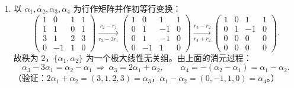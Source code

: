 \documentclass[12pt]{ctexart}
\begin{document}
\begin{enumerate}[label=\textbf{\arabic*.},itemsep=13pt]
\item 以 $\alpha_1,\alpha_2,\alpha_3,\alpha_4$ 为行作矩阵并作初等行变换：
  \[
  \begin{pmatrix}1&0&1&1\\1&1&0&1\\3&1&2&3\\0&-1&1&0\end{pmatrix}
  \xrightarrow[r_3-3r_1]{r_2-r_1}
  \begin{pmatrix}1&0&1&1\\0&1&-1&0\\0&1&-1&0\\0&-1&1&0\end{pmatrix}
  \xrightarrow[r_4+r_2]{r_3-r_2}
  \begin{pmatrix}1&0&1&1\\0&1&-1&0\\0&0&0&0\\0&0&0&0\end{pmatrix}.
  \]
  故秩为 $2$，$\{\alpha_1,\alpha_2\}$ 为一个极大线性无关组。由上面的消元过程：
  \[
  \alpha_3-3\alpha_1=\alpha_2-\alpha_1\ \Rightarrow\ \alpha_3=2\alpha_1+\alpha_2,\qquad
  \alpha_4=-(\alpha_2-\alpha_1)=\alpha_1-\alpha_2.
  \]
  （验证：$2\alpha_1+\alpha_2=(3,1,2,3)=\alpha_3$，$\alpha_1-\alpha_2=(0,-1,1,0)=\alpha_4$。）
\end{enumerate}
\end{document}
